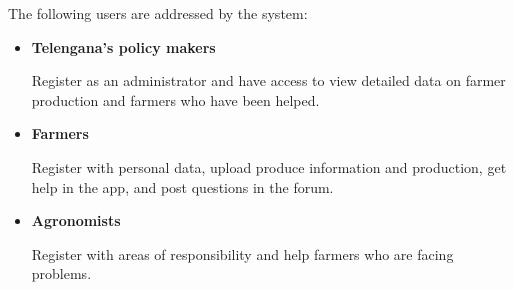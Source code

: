\documentclass[../../main.tex]{subfiles}
\begin{document}
	The following users are addressed by the system:
	\begin{itemize}
		\item \textbf{Telengana's policy makers}
		
		Register as an administrator and have access to view detailed data on farmer production and farmers who have been helped.
		\item 
		\textbf{Farmers}
		
		Register with personal data, upload produce information and production, get help in the app, and post questions in the forum.
		\item \textbf{Agronomists}
		
		Register with areas of responsibility and help farmers who are facing problems.
	\end{itemize}
\end{document}
